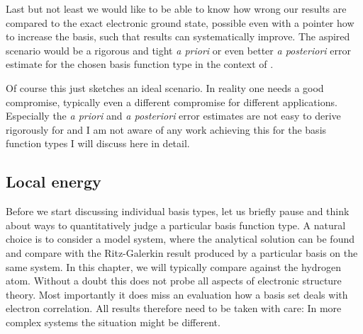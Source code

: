 Last but not least we would like to be able to know
how wrong our \HF results are compared to the exact electronic ground state,
possible even with a pointer how to increase the basis,
such that results can systematically improve.
The aspired scenario would be a rigorous and tight
\textit{a priori} or even better \textit{a posteriori} error estimate
for the chosen basis function type in the context of \HF.

Of course this just sketches an ideal scenario.
In reality one needs a good compromise,
typically even a different compromise for different applications.
Especially the \textit{a priori} and \textit{a posteriori} error estimates
are not easy to derive rigorously for \HF
and I am not aware of any work achieving this for the basis function
types I will discuss here in detail.

\subsection{Local energy}
Before we start discussing individual basis types,
let us briefly pause and think about ways to quantitatively
judge a particular basis function type.
A natural choice is to consider a model system,
where the analytical solution can be found and compare
with the Ritz-Galerkin \HF result produced by a particular basis on the same system.
In this chapter, we will typically compare against the hydrogen atom.
Without a doubt this does not probe all aspects of electronic structure theory.
Most importantly it does miss an evaluation how a basis set deals with electron correlation.
All results therefore need to be taken with care:
In more complex systems the situation might be different.

